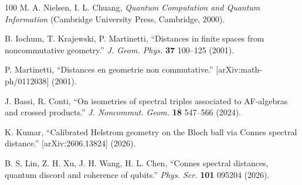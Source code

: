 \documentclass[a4paper,12pt]{article}
\begin{document}
\begin{thebibliography}{100}
	M. A. Nielsen, I. L. Chuang, \textit{Quantum
				Computation and Quantum Information} (Cambridge University Press,
	Cambridge, 2000).
	
	B. Iochum, T. Krajewski, P. Martinetti, ``Distances in
	finite spaces from noncommutative geometry.'' \textit{J. Geom.
				Phys.} \textbf{37} 100--125 (2001).
				
	 P. Martinetti, ``Distances en geometrie non commutative.'' [arXiv:math-ph/0112038] (2001).
	

	
	 J. Bassi, R. Conti, ``On isometries of spectral triples associated to AF-algebras
	and crossed products.'' \textit{J. Noncommut. Geom.} \textbf{18} 547--566 (2024).

	 K. Kumar, ``Calibrated Helstrom geometry on the Bloch ball via Connes spectral distance.'' [arXiv:2606.13824] (2026).

    B. S. Lin, Z. H. Xu, J. H. Wang, H. L. Chen,
  ``Connes spectral distances, quantum discord and coherence of qubits.''
  \textit{Phys. Scr.} \textbf{101} 095204 (2026).
  
\end{thebibliography}
\end{document}
